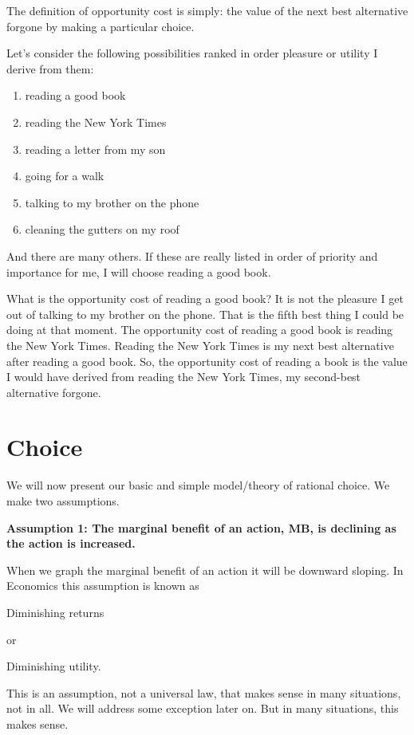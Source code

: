 \documentclass[
]{book}
\providecommand{\tightlist}{%
  \setlength{\itemsep}{0pt}\setlength{\parskip}{0pt}}
\begin{document}
The definition of opportunity cost is simply: the value of the next best alternative forgone by making a particular choice.

Let's consider the following possibilities ranked in order pleasure or utility I derive from them:

\begin{enumerate}
\def\labelenumi{\arabic{enumi}.}
\tightlist
\item
  reading a good book
\item
  reading the New York Times
\item
  reading a letter from my son
\item
  going for a walk
\item
  talking to my brother on the phone
\item
  cleaning the gutters on my roof
\end{enumerate}

And there are many others. If these are really listed in order of priority and importance for me, I will choose reading a good book.

What is the opportunity cost of reading a good book? It is not the pleasure I get out of talking to my brother on the phone. That is the fifth best thing I could be doing at that moment. The opportunity cost of reading a good book is reading the New York Times. Reading the New York Times is my next best alternative after reading a good book. So, the opportunity cost of reading a book is the value I would have derived from reading the New York Times, my second-best alternative forgone.

\hypertarget{choice}{%
\section{Choice}\label{choice}}

We will now present our basic and simple model/theory of rational choice. We make two assumptions.

\textbf{Assumption 1: The marginal benefit of an action, MB, is declining as the action is increased.}

When we graph the marginal benefit of an action it will be downward sloping. In Economics this assumption is known as

Diminishing returns

or

Diminishing utility.

This is an assumption, not a universal law, that makes sense in many situations, not in all. We will address some exception later on. But in many situations, this makes sense.
\end{document}
